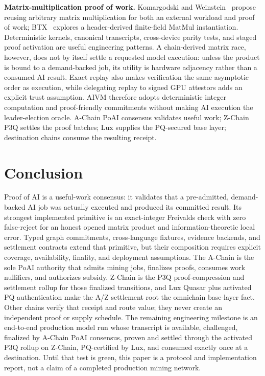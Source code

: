 \documentclass[11pt,a4paper]{article}
\begin{document}
\textbf{Matrix-multiplication proof of work.} Komargodski and Weinstein~\cite{matmulpow} propose reusing arbitrary matrix multiplication for both an external workload and proof of work; BTX~\cite{btx} explores a header-derived finite-field MatMul instantiation. Deterministic kernels, canonical transcripts, cross-device parity tests, and staged proof activation are useful engineering patterns. A chain-derived matrix race, however, does not by itself settle a requested model execution: unless the product is bound to a demand-backed job, its utility is hardware adjacency rather than a consumed AI result. Exact replay also makes verification the same asymptotic order as execution, while delegating replay to signed GPU attestors adds an explicit trust assumption. AIVM therefore adopts deterministic integer computation and proof-friendly commitments without making AI execution the leader-election oracle. A-Chain PoAI consensus validates useful work; Z-Chain P3Q settles the proof batches; Lux supplies the PQ-secured base layer; destination chains consume the resulting receipt.

\section{Conclusion}

Proof of AI is a useful-work consensus: it validates that a pre-admitted, demand-backed AI job was actually executed and produced its committed result. Its strongest implemented primitive is an exact-integer Freivalds check with zero false-reject for an honest opened matrix product and information-theoretic local error. Typed graph commitments, cross-language fixtures, evidence backends, and settlement contracts extend that primitive, but their composition requires explicit coverage, availability, finality, and deployment assumptions. The A-Chain is the sole PoAI authority that admits mining jobs, finalizes proofs, consumes work nullifiers, and authorizes subsidy. Z-Chain is the P3Q proof-compression and settlement rollup for those finalized transitions, and Lux Quasar plus activated PQ authentication make the A/Z settlement root the omnichain base-layer fact. Other chains verify that receipt and route value; they never create an independent proof or supply schedule. The remaining engineering milestone is an end-to-end production model run whose transcript is available, challenged, finalized by A-Chain PoAI consensus, proven and settled through the activated P3Q rollup on Z-Chain, PQ-certified by Lux, and consumed exactly once at a destination. Until that test is green, this paper is a protocol and implementation report, not a claim of a completed production mining network.
\end{document}

